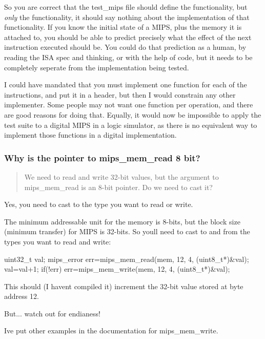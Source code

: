 So you are correct that the test\+\_\+mips file should define the functionality, but {\itshape only} the functionality, it should say nothing about the implementation of that functionality. If you know the initial state of a M\+I\+P\+S, plus the memory it is attached to, you should be able to predict precisely what the effect of the next instruction executed should be. You could do that prediction as a human, by reading the I\+S\+A spec and thinking, or with the help of code, but it needs to be completely seperate from the implementation being tested.

I could have mandated that you must implement one function for each of the instructions, and put it in a header, but then I would constrain any other implementer. Some people may not want one function per operation, and there are good reasons for doing that. Equally, it would now be impossible to apply the test suite to a digital M\+I\+P\+S in a logic simulator, as there is no equivalent way to implement those functions in a digital implementation.

\subsubsection*{Why is the pointer to mips\+\_\+mem\+\_\+read 8 bit?}

\begin{quote}
We need to read and write 32-\/bit values, but the argument to mips\+\_\+mem\+\_\+read is an 8-\/bit pointer. Do we need to cast it? \end{quote}


Yes, you need to cast to the type you want to read or write.

The minimum addressable unit for the memory is 8-\/bits, but the block size (minimum transfer) for M\+I\+P\+S is 32-\/bits. So you\textquotesingle{}ll need to cast to and from the types you want to read and write\+: \begin{DoxyVerb}uint32_t val;
mips_error err=mips_mem_read(mem, 12, 4, (uint8_t*)&val);
val=val+1;
if(!err)
    err=mips_mem_write(mem, 12, 4, (uint8_t*)&val);
\end{DoxyVerb}


This should (I haven\textquotesingle{}t compiled it) increment the 32-\/bit value stored at byte address 12.

But... watch out for endianess!

I\textquotesingle{}ve put other examples in the documentation for mips\+\_\+mem\+\_\+write.

